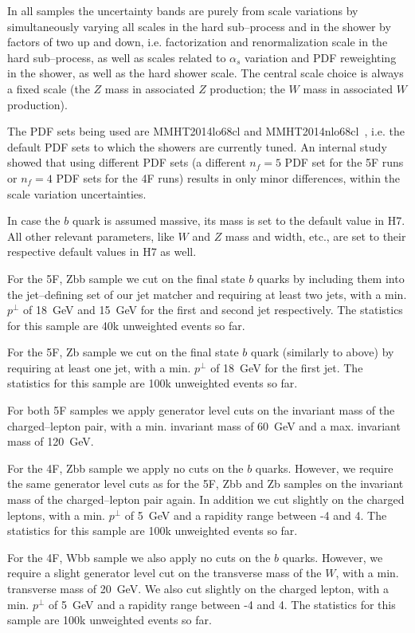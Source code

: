 \documentclass[11pt]{cernrep}
\newcommand{\Herwig}{H\protect\scalebox{0.8}{ERWIG}7\xspace}
\begin{document}
\medskip

In all samples the uncertainty bands are purely from scale variations by
simultaneously varying all scales in the hard sub--process and in the shower by
factors of two up and down, i.e. factorization and renormalization scale in the
hard sub--process, as well as scales related to $\alpha_s$ variation and PDF
reweighting in the shower, as well as the hard shower scale. The central scale
choice is always a fixed scale (the $Z$ mass in associated $Z$ production; the
$W$ mass in associated $W$ production).

The PDF sets being used are MMHT2014lo68cl and
MMHT2014nlo68cl~\cite{Harland-Lang:2014zoa}, i.e. the default PDF sets
to which the showers are currently tuned. An internal study showed that using
different PDF sets (a different $n_f\!\!=\!\!5$ PDF set for the 5F runs or
$n_f\!\!=\!\!4$ PDF sets for the 4F runs) results in only minor differences,
within the scale variation uncertainties.

In case the $b$ quark is assumed massive, its mass is set to the default value
in \Herwig. All other relevant parameters, like $W$ and $Z$ mass and width,
etc., are set to their respective default values in \Herwig as well.

For the 5F, Zbb sample we cut on the final state $b$ quarks by including them
into the jet--defining set of our jet matcher and requiring at least two jets,
with a min. $p^\bot$ of 18~GeV and 15~GeV for the first and second jet
respectively. The statistics for this sample are 40k unweighted events so far.

For the 5F, Zb sample we cut on the final state $b$ quark (similarly to above)
by requiring at least one jet, with a min. $p^\bot$ of 18~GeV for the first jet.
The statistics for this sample are 100k unweighted events so far.

For both 5F samples we apply generator level cuts on the invariant mass of the
charged--lepton pair, with a min. invariant mass of 60~GeV and a max. invariant
mass of 120~GeV.

For the 4F, Zbb sample we apply no cuts on the $b$ quarks. However, we require
the same generator level cuts as for the 5F, Zbb and Zb samples on the invariant
mass of the charged--lepton pair again. In addition we cut slightly on the
charged leptons, with a min. $p^\bot$ of 5~GeV and a rapidity range between -4
and 4. The statistics for this sample are 100k unweighted events so far.

For the 4F, Wbb sample we also apply no cuts on the $b$ quarks. However, we
require a slight generator level cut on the transverse mass of the $W$, with a
min. transverse mass of 20~GeV. We also cut slightly on the charged lepton, with
a min. $p^\bot$ of 5~GeV and a rapidity range between -4 and 4. The statistics
for this sample are 100k unweighted events so far.
\end{document}
